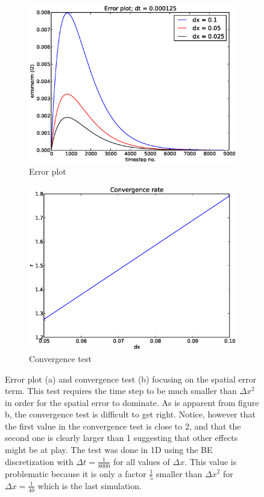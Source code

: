 \begin{figure}[H]
 \centering
 \begin{subfigure}[b]{0.48\textwidth}
  \includegraphics[width=\textwidth]{../doc/results/experiment_14042014_1303_convergence_tests_etc/results/errorplot.eps}
  \caption{Error plot}
 \end{subfigure}
 \begin{subfigure}[b]{0.48\textwidth}
  \includegraphics[width=\textwidth]{../doc/results/experiment_14042014_1303_convergence_tests_etc/results/ConvergenceTest.eps}
  \caption{Convergence test}
 \end{subfigure}
 \caption[Verification of spatial derivative]{Error plot (a) and convergence test (b) focusing on the spatial error term. This test requires the time step to be much smaller than $\Delta x^2$ in order for the spatial error to dominate. As is apparent from figure b, the convergence test is difficult to get right. Notice, however that the first value in the convergence test is close to 2, and that the second one is clearly larger than 1 suggesting that other effects might be at play. The test was done in 1D using the BE discretization with $\Delta t = \frac{1}{8000}$ for all values of $\Delta x$. This value is problematic because it is only a factor $\frac{1}{5}$ smaller than $\Delta x^2$ for $\Delta x = \frac{1}{40}$ which is the last simulation.}

\end{figure}
